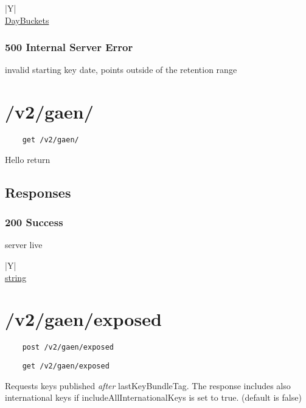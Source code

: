 \documentclass[a4paper
]{ubarticle}
\begin{document}
    
        \begin{ubresponses}{\textwidth}{|Y|}
        \\
        \hline
             \hyperref[sec:DayBuckets] { DayBuckets } \\
 \hline

        \end{ubresponses}
    
\subsubsection{ 500 Internal Server Error }
invalid starting key date, points outside of the retention range
 


\section{ /v2/gaen/ }
    \begin{verbatim}
    get /v2/gaen/
    \end{verbatim}
Hello return

\subsection{Responses}
\subsubsection{ 200 Success }
server live
 

    
        \begin{ubresponses}{\textwidth}{|Y|}
        \\
        \hline
             \hyperref[sec:string] { string } \\
 \hline

        \end{ubresponses}
    
\section{ /v2/gaen/exposed }
    \begin{verbatim}
    post /v2/gaen/exposed
    \end{verbatim}
    \begin{verbatim}
    get /v2/gaen/exposed
    \end{verbatim}
Requests keys published \emph{after} lastKeyBundleTag. The response includes also international keys if includeAllInternationalKeys is set to true. (default is false)
\end{document}
